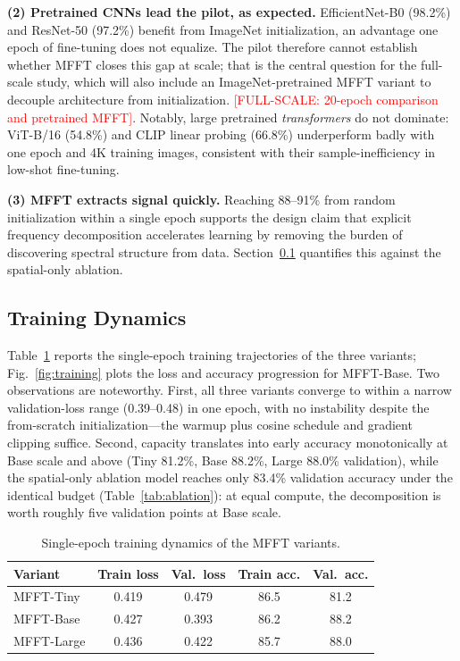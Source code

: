 \documentclass[journal]{IEEEtran}
\newcommand{\fullscale}[1]{\textcolor{red}{[FULL-SCALE: #1]}}
\begin{document}
\textbf{(2) Pretrained CNNs lead the pilot, as expected.} EfficientNet-B0 (98.2\%) and ResNet-50 (97.2\%) benefit from ImageNet initialization, an advantage one epoch of fine-tuning does not equalize. The pilot therefore cannot establish whether MFFT closes this gap at scale; that is the central question for the full-scale study, which will also include an ImageNet-pretrained MFFT variant to decouple architecture from initialization. \fullscale{20-epoch comparison and pretrained MFFT}. Notably, large pretrained \emph{transformers} do not dominate: ViT-B/16 (54.8\%) and CLIP linear probing (66.8\%) underperform badly with one epoch and 4K training images, consistent with their sample-inefficiency in low-shot fine-tuning.

\textbf{(3) MFFT extracts signal quickly.} Reaching 88--91\% from random initialization within a single epoch supports the design claim that explicit frequency decomposition accelerates learning by removing the burden of discovering spectral structure from data. Section~\ref{sec:dynamics} quantifies this against the spatial-only ablation.

\subsection{Training Dynamics}
\label{sec:dynamics}
Table~\ref{tab:dynamics} reports the single-epoch training trajectories of the three variants; Fig.~\ref{fig:training} plots the loss and accuracy progression for MFFT-Base. Two observations are noteworthy. First, all three variants converge to within a narrow validation-loss range (0.39--0.48) in one epoch, with no instability despite the from-scratch initialization---the warmup plus cosine schedule and gradient clipping suffice. Second, capacity translates into early accuracy monotonically at Base scale and above (Tiny 81.2\%, Base 88.2\%, Large 88.0\% validation), while the spatial-only ablation model reaches only 83.4\% validation accuracy under the identical budget (Table~\ref{tab:ablation}): at equal compute, the decomposition is worth roughly five validation points at Base scale.

\begin{table}[!t]
\renewcommand{\arraystretch}{1.2}
\caption{Single-epoch training dynamics of the MFFT variants.}
\label{tab:dynamics}
\centering
\setlength{\tabcolsep}{4pt}
\begin{tabular}{lcccc}
\toprule
Variant & Train loss & Val.\ loss & Train acc. & Val.\ acc. \\
\midrule
MFFT-Tiny  & 0.419  & 0.479 & 86.5 & 81.2 \\
MFFT-Base  & 0.427  & 0.393 & 86.2 & 88.2 \\
MFFT-Large & 0.436  & 0.422 & 85.7 & 88.0 \\
\bottomrule
\end{tabular}
\end{table}
\end{document}
